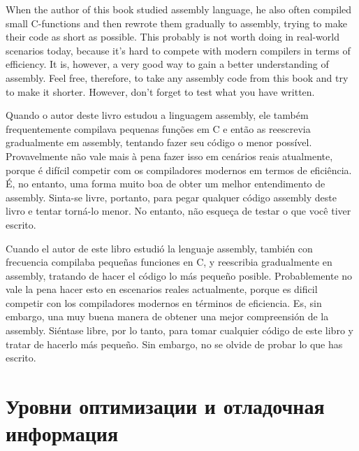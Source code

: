 \ifdefined\ENGLISH
When the author of this book studied assembly language, he also often compiled small C-functions and then rewrote
them gradually to assembly, trying to make their code as short as possible.
This probably is not worth doing in real-world scenarios today, 
because it's hard to compete with modern compilers in terms of efficiency. It is, however, a very good way to gain a better understanding of assembly.
Feel free, therefore, to take any assembly code from this book and try to make it shorter.
However, don't forget to test what you have written.
\fi %

\ifdefined\BRAZILIAN
Quando o autor deste livro estudou a linguagem assembly, ele também frequentemente compilava pequenas funções em C e então as reescrevia gradualmente em assembly, tentando fazer seu código o menor possível.
Provavelmente não vale mais à pena fazer isso em cenários reais atualmente, 
porque é difícil competir com os compiladores modernos em termos de eficiência. É, no entanto, uma forma muito boa de obter um melhor entendimento de assembly.
Sinta-se livre, portanto, para pegar qualquer código assembly deste livro e tentar torná-lo menor.
No entanto, não esqueça de testar o que você tiver escrito.
\fi %

\ifdefined\SPANISH
Cuando el autor de este libro estudió la lenguaje assembly, también con frecuencia compilaba pequeñas funciones en C, y reescribia gradualmente en assembly, tratando de hacer el código lo más pequeño posible.
Probablemente no vale la pena hacer esto en escenarios reales actualmente, 
porque es dificil competir con los compiladores modernos en términos de eficiencia. Es, sin embargo, una muy buena manera de obtener una mejor compreensión de la assembly.
Siéntase libre, por lo tanto, para tomar cualquier código de este libro y tratar de hacerlo más pequeño.
Sin embargo, no se olvide de probar lo que has escrito.
\fi %

\fi %

\ifdefined\RUSSIAN
\section*{Уровни оптимизации и отладочная информация}

